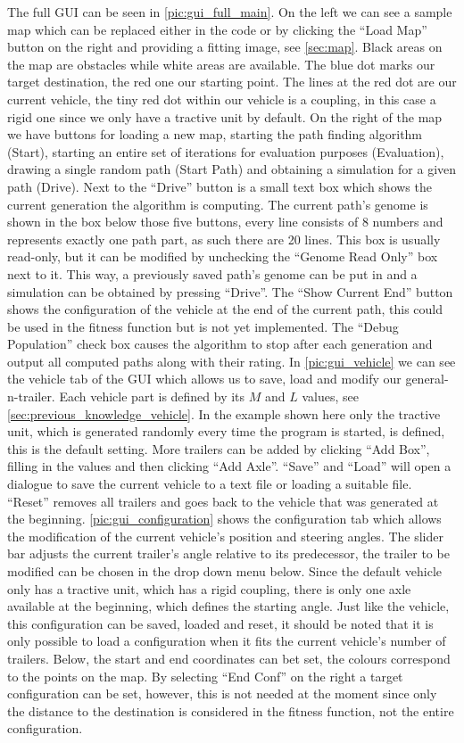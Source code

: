 The full GUI can be seen in \ref{pic:gui_full_main}. On the left we can see a sample map which can be replaced either in the code or by clicking the "`Load Map"' button on the right and providing a fitting image, see \ref{sec:map}. Black areas on the map are obstacles while white areas are available. The blue dot marks our target destination, the red one our starting point. The lines at the red dot are our current vehicle, the tiny red dot within our vehicle is a coupling, in this case a rigid one since we only have a tractive unit by default. On the right of the map we have buttons for loading a new map, starting the path finding algorithm (Start), starting an entire set of iterations for evaluation purposes (Evaluation), drawing a single random path (Start Path) and obtaining a simulation for a given path (Drive). Next to the "`Drive"' button is a small text box which shows the current generation the algorithm is computing. The current path's genome is shown in the box below those five buttons, every line consists of 8 numbers and represents exactly one path part, as such there are 20 lines. This box is usually read-only, but it can be modified by unchecking the "`Genome Read Only"' box next to it. This way, a previously saved path's genome can be put in and a simulation can be obtained by pressing "`Drive"'. The "`Show Current End"' button shows the configuration of the vehicle at the end of the current path, this could be used in the fitness function but is not yet implemented. The "`Debug Population"' check box causes the algorithm to stop after each generation and output all computed paths along with their rating. 
In \ref{pic:gui_vehicle} we can see the vehicle tab of the GUI which allows us to save, load and modify our general-n-trailer. Each vehicle part is defined by its $M$ and $L$ values, see \ref{sec:previous_knowledge_vehicle}. In the example shown here only the tractive unit, which is generated randomly every time the program is started, is defined, this is the default setting. More trailers can be added by clicking "`Add Box"', filling in the values and then clicking "`Add Axle"'. "`Save"' and "`Load"' will open a dialogue to save the current vehicle to a text file or loading a suitable file. "`Reset"' removes all trailers and goes back to the vehicle that was generated at the beginning.
\ref{pic:gui_configuration} shows the configuration tab which allows the modification of the current vehicle's position and steering angles. The slider bar adjusts the current trailer's angle relative to its predecessor, the trailer to be modified can be chosen in the drop down menu below. Since the default vehicle only has a tractive unit, which has a rigid coupling, there is only one axle available at the beginning, which defines the starting angle. Just like the vehicle, this configuration can be saved, loaded and reset, it should be noted that it is only possible to load a configuration when it fits the current vehicle's number of trailers. Below, the start and end coordinates can bet set, the colours correspond to the points on the map. By selecting "`End Conf"' on the right a target configuration can be set, however, this is not needed at the moment since only the distance to the destination is considered in the fitness function, not the entire configuration.


